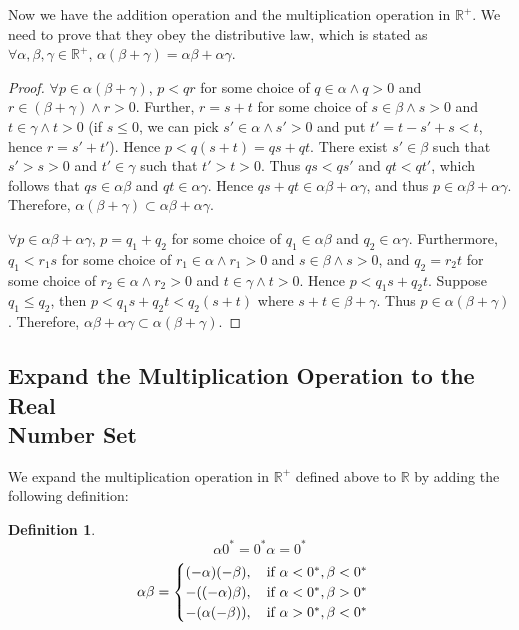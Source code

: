 \documentclass{article}
\newtheorem{definition}{Definition}[section]
\begin{document}
Now we have the addition operation and the multiplication operation in 
$\mathbb{R^+}$. We need to prove that they obey the distributive law, which is 
stated as $\forall \alpha, \beta, \gamma \in \mathbb{R^+}$, 
$\alpha (\beta + \gamma) = \alpha \beta + \alpha \gamma$.
\begin{proof}
  $\forall p \in \alpha (\beta + \gamma)$, $p < qr$ for some choice of 
  $q \in \alpha \wedge q > 0$ and $r \in (\beta + \gamma) \wedge r > 0$. 
  Further, $r = s + t$ for some choice of $s \in \beta \wedge s > 0$ and 
  $t \in \gamma \wedge t > 0$ (if $s \leq 0$, we can pick 
  $s' \in \alpha \wedge s' > 0$ and put $t' = t - s' + s < t$, hence 
  $r = s' + t'$). Hence $p < q (s + t) = qs + qt$. There exist $s' \in \beta$ 
  such that $s' > s > 0$ and $t' \in \gamma$ such that $t' > t > 0$. Thus 
  $qs < qs'$ and $qt < qt'$, which follows that $qs \in \alpha \beta$ and 
  $qt \in \alpha \gamma$. Hence $qs + qt \in \alpha \beta + \alpha \gamma$, and 
  thus $p \in \alpha \beta + \alpha \gamma$. Therefore, 
  $\alpha (\beta + \gamma) \subset \alpha \beta + \alpha \gamma$.

  $\forall p \in \alpha \beta + \alpha \gamma$, $p = q_1 + q_2$ for some choice 
  of $q_1 \in \alpha \beta$ and $q_2 \in \alpha \gamma$. Furthermore, 
  $q_1 < r_1 s$ for some choice of $r_1 \in \alpha \wedge r_1 > 0$ and 
  $s \in \beta \wedge s > 0$, and $q_2 = r_2 t$ for some choice of 
  $r_2 \in \alpha \wedge r_2 > 0$ and $t \in \gamma \wedge t > 0$. Hence 
  $p < q_1 s + q_2 t$. Suppose $q_1 \leq q_2$, then 
  $p < q_1 s + q_2 t < q_2 (s + t)$ where $s + t \in \beta + \gamma$. Thus 
  $p \in \alpha (\beta + \gamma)$. Therefore, 
  $\alpha \beta + \alpha \gamma \subset \alpha (\beta + \gamma)$.
\end{proof}

\subsection{Expand the Multiplication Operation to the Real \\ Number Set}

We expand the multiplication operation in $\mathbb{R^+}$ defined above to 
$\mathbb{R}$ by adding the following definition:
\begin{definition}
  \[
    \alpha 0^* = 0^* \alpha = 0^*
  \]
  \[
    \alpha \beta = 
    \begin{cases}
      (-\alpha)(-\beta), \quad \textnormal{if } \alpha < 0^*, \beta < 0^* \\
      -((-\alpha)\beta), \quad \textnormal{if } \alpha < 0^*, \beta > 0^* \\
      -(\alpha(-\beta)), \quad \textnormal{if } \alpha > 0^*, \beta < 0^*       
    \end{cases}
  \]
\end{definition}
\end{document}
